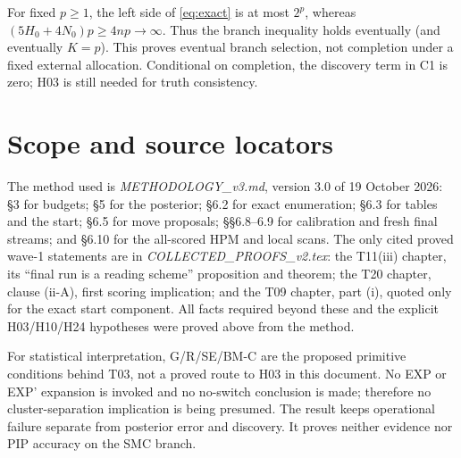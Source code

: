 ﻿\documentclass[11pt]{article}
\newcommand{\1}{\mathbf 1}
\begin{document}
For fixed \(p\ge1\), the left side of \eqref{eq:exact} is at most
\(2^p\), whereas
\((5H_0+4N_0)p\ge4np\to\infty\). Thus the branch inequality holds
eventually (and eventually \(K=p\)). This proves eventual branch selection,
not completion under a fixed external allocation. Conditional on completion,
the discovery term in C1 is zero; H03 is still needed for truth consistency.

\section{Scope and source locators}
\small
The method used is \emph{METHODOLOGY\_v3.md}, version 3.0 of 19 October 2026:
\S3 for budgets; \S5 for the posterior; \S6.2 for exact enumeration;
\S6.3 for tables and the start; \S6.5 for move proposals;
\S\S6.8--6.9 for calibration and fresh final streams; and \S6.10 for the
all-scored HPM and local scans. The only cited proved wave-1 statements
are in \emph{COLLECTED\_PROOFS\_v2.tex}: the T11(iii) chapter, its
``final run is a reading scheme'' proposition and theorem; the T20 chapter,
clause (ii-A), first scoring implication; and the T09 chapter, part (i),
quoted only for the exact start component. All facts required beyond these
and the explicit H03/H10/H24 hypotheses were proved above from the method.

For statistical interpretation, G/R/SE/BM-C are the proposed primitive
conditions behind T03, not a proved route to H03 in this document. No
EXP or EXP' expansion is invoked and no no-switch conclusion is made;
therefore no cluster-separation implication is being presumed. The result
keeps operational failure separate from posterior error and discovery.
It proves neither evidence nor PIP accuracy on the SMC branch.
\end{document}
